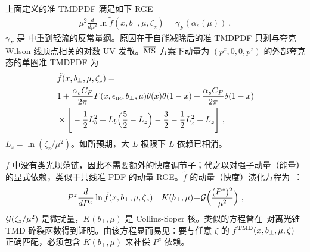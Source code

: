 上面定义的准 TMDPDF 满足如下 RGE~\cite{Collins:1981uk,Ji:2014hxa,Ji:2019ewn}
\begin{align}
	\mu^2 \frac{d}{d\mu^2}\ln \tilde f(x,b_\perp,\mu,\zeta_z)=\gamma_{F}(\alpha_s(\mu)) \ ,
\end{align}
$\gamma_F$ 是  中重到轻流的反常量纲。原因在于自能减除后的准 TMDPDF 只剩与夸克—Wilson 线顶点相关的对数 UV 发散。${\overline{\rm MS}}$ 方案下动量为 $(p^z,0,0,p^z)$ 的外部夸克态的单圈准 TMDPDF 为~\cite{Ji:2018hvs,Ebert:2019okf}
\begin{align}
	&\tilde f(x,b_\perp,\mu,\zeta_z)=\nonumber \\ &1+\frac{\alpha_sC_F}{2\pi}F(x,\epsilon_{\tiny \mbox{IR}},b_\perp,\mu)\theta(x)\theta(1-x)+\frac{\alpha_sC_F}{2\pi}\delta(1-x) \nonumber \\
	& \times \Bigg[-\frac{1}{2}L_b^2+L_b\Big(\frac{5}{2}-L_z\Big)-\frac{3}{2}-\frac{1}{2}L_z^2+L_z\Bigg]\ ,
\end{align}
$L_z=\ln(\zeta_z/\mu^2)$。如所预期，大 $L$ 极限下 $L$ 依赖已相消。

$\tilde f$ 中没有类光规范链，因此不需要额外的快度调节子；代之以对强子动量（能量）的显式依赖，类似于共线准 PDF 的动量 RGE。$\tilde f$ 的动量（快度）演化方程为~\cite{Collins:1981uk,Ji:2014hxa,Ji:2019ewn}：
\begin{align}
	P^z\frac{d}{dP^z}\ln \tilde f(x,b_\perp,\mu,\zeta_z) \!=\! K(b_\perp,\mu)\!+\!{\cal G}\Big(\frac{(P^z)^2}{\mu^2}\Big) \ ,
\end{align}
${\cal G}(\zeta_z/\mu^2)$ 是微扰量，$K(b_\perp,\mu)$ 是 Collins-Soper 核。类似的方程曾在~\cite{Collins:1981uk}对离光锥 TMD 碎裂函数得到证明。由该方程显而易见：要与任意 $\zeta$ 的 $f^{\rm TMD}(x,b_\perp,\mu,\zeta)$ 正确匹配，必须包含 $K(b_\perp,\mu)$ 来补偿 $P^z$ 依赖。

